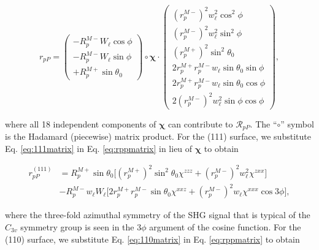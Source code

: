 \documentclass[aps,prb,10pt,showpacs,letterpaper,twocolumn]{revtex4-1}
\begin{document}
{\color{red}
\begin{widetext}
\begin{equation}\label{eq:rppmatrix}
r_{pP} =
\begin{pmatrix}
-R^{M-}_{p}W_{\ell}\cos\phi \\[3pt]
-R^{M-}_{p}W_{\ell}\sin\phi \\[3pt]
+R^{M+}_{p}\sin\theta_{0}
\end{pmatrix}
\circ
\boldsymbol{\chi}
\cdot
\begin{pmatrix}
\left(r^{M-}_{p}\right)^{2}w^{2}_{\ell}\cos^{2}\phi\\[8pt]
\left(r^{M-}_{p}\right)^{2}w^{2}_{\ell}\sin^{2}\phi\\[8pt]
\left(r^{M+}_{p}\right)^{2}\sin^{2}\theta_{0}\\[8pt]
2r^{M+}_{p}r^{M-}_{p}w_{\ell}\sin\theta_{0}\sin\phi\\[8pt]
2r^{M+}_{p}r^{M-}_{p}w_{\ell}\sin\theta_{0}\cos\phi\\[8pt]
2\left(r^{M-}_{p}\right)^{2}w^{2}_{\ell}\sin\phi\cos\phi
\end{pmatrix}
,
\end{equation}
\end{widetext}
where all 18 independent components of $\boldsymbol{\chi}$ can contribute to
$\mathcal{R}_{pP}$. The ``$\circ$'' symbol is the Hadamard (piecewise) matrix
product. For the (111) surface, we substitute Eq. \eqref{eq:111matrix} in Eq.
\eqref{eq:rppmatrix} in lieu of $\boldsymbol{\chi}$ to obtain
}
\begin{widetext}
\begin{equation}\label{eq:rpp111}
\begin{split}
r^{(111)}_{pP} &= 
R^{M+}_{p}\sin\theta_{0}
\Big[
  \left(r^{M+}_{p}\right)^{2}\sin^{2}\theta_{0}\chi^{zzz}
+ \left(r^{M-}_{p}\right)^{2}w^{2}_{\ell}\chi^{zxx}
\Big]\\
&- R^{M-}_{p}w_{\ell}W_{\ell}
\Big[
  2r^{M+}_{p}r^{M-}_{p}\sin\theta_{0}\chi^{xxz}
+ \left(r^{M-}_{p}\right)^{2}w_{\ell}\chi^{xxx}\cos3\phi
\Big],
\end{split}
\end{equation}
\end{widetext}
where the three-fold azimuthal symmetry of the SHG signal that is typical of the
$C_{3v}$ symmetry group is seen in the $3\phi$ argument of the cosine function.
{\color{red}
For the (110) surface, we substitute Eq. \eqref{eq:110matrix} in Eq. 
\eqref{eq:rppmatrix} to obtain
}
\end{document}
